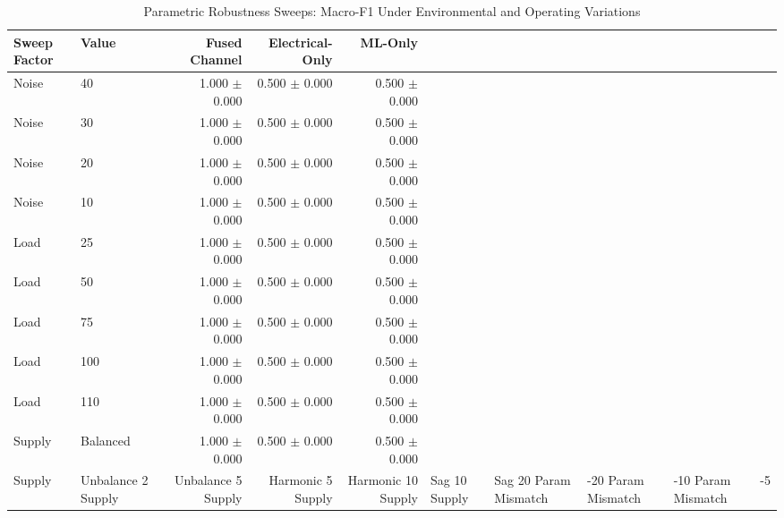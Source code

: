 \begin{table}[htbp]
\centering
\caption{Parametric Robustness Sweeps: Macro-F1 Under Environmental and Operating Variations}
\label{tab:robustness_sweeps}
\begin{tabular}{llrrr}
\toprule
Sweep Factor & Value & Fused Channel & Electrical-Only & ML-Only \\
\midrule
Noise & 40 & 1.000 $\pm$ 0.000 & 0.500 $\pm$ 0.000 & 0.500 $\pm$ 0.000 \\
Noise & 30 & 1.000 $\pm$ 0.000 & 0.500 $\pm$ 0.000 & 0.500 $\pm$ 0.000 \\
Noise & 20 & 1.000 $\pm$ 0.000 & 0.500 $\pm$ 0.000 & 0.500 $\pm$ 0.000 \\
Noise & 10 & 1.000 $\pm$ 0.000 & 0.500 $\pm$ 0.000 & 0.500 $\pm$ 0.000 \\
\midrule
Load & 25 & 1.000 $\pm$ 0.000 & 0.500 $\pm$ 0.000 & 0.500 $\pm$ 0.000 \\
Load & 50 & 1.000 $\pm$ 0.000 & 0.500 $\pm$ 0.000 & 0.500 $\pm$ 0.000 \\
Load & 75 & 1.000 $\pm$ 0.000 & 0.500 $\pm$ 0.000 & 0.500 $\pm$ 0.000 \\
Load & 100 & 1.000 $\pm$ 0.000 & 0.500 $\pm$ 0.000 & 0.500 $\pm$ 0.000 \\
Load & 110 & 1.000 $\pm$ 0.000 & 0.500 $\pm$ 0.000 & 0.500 $\pm$ 0.000 \\
\midrule
Supply & Balanced & 1.000 $\pm$ 0.000 & 0.500 $\pm$ 0.000 & 0.500 $\pm$ 0.000 \\
Supply & Unbalance 2%
Supply & Unbalance 5%
Supply & Harmonic 5%
Supply & Harmonic 10%
Supply & Sag 10%
Supply & Sag 20%
\midrule
Param Mismatch & -20%
Param Mismatch & -10%
Param Mismatch & -5%

\end{tabular}
\end{table}
